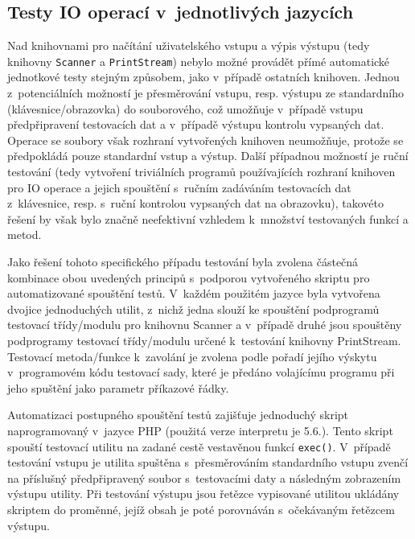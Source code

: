 \documentclass[czech,BP]{thesiskiv}
\begin{document}
\subsection{Testy IO operací v~jednotlivých jazycích}
Nad knihovnami pro načítání uživatelského vstupu a výpis výstupu (tedy knihovny \texttt{Scanner} a \texttt{PrintStream}) nebylo možné provádět přímé automatické jednotkové testy stejným způsobem, jako v~případě ostatních knihoven. Jednou z~potenciálních možností je přesměrování vstupu, resp. výstupu ze standardního (klávesnice/obrazovka) do souborového, což umožňuje v~případě vstupu předpřipravení testovacích dat a v~případě výstupu kontrolu vypsaných dat. Operace se soubory však rozhraní vytvořených knihoven neumožňuje, protože se předpokládá pouze standardní vstup a výstup. Další případnou možností je ruční testování (tedy vytvoření triviálních programů používajících rozhraní knihoven pro IO operace a jejich spouštění s~ručním zadáváním testovacích dat z~klávesnice, resp. s~ruční kontrolou vypsaných dat na obrazovku), takovéto řešení by však bylo značně neefektivní vzhledem k~množství testovaných funkcí a metod.\par
Jako řešení tohoto specifického případu testování byla zvolena částečná kombinace obou uvedených principů s~podporou vytvořeného skriptu pro automatizované spouštění testů. V~každém použitém jazyce byla vytvořena dvojice jednoduchých utilit, z~nichž jedna slouží ke spouštění podprogramů testovací třídy/modulu pro knihovnu Scanner a v~případě druhé jsou spouštěny podprogramy testovací třídy/modulu určené k~testování knihovny PrintStream. Testovací metoda/funkce k~zavolání je zvolena podle pořadí jejího výskytu v~programovém kódu testovací sady, které je předáno volajícímu programu při jeho spuštění jako parametr příkazové řádky.\par
Automatizaci postupného spouštění testů zajišťuje jednoduchý skript naprogramovaný v~jazyce PHP (použitá verze interpretu je 5.6.). Tento skript spouští testovací utilitu na zadané cestě vestavěnou funkcí \texttt{exec()}. V~případě testování vstupu je utilita spuštěna s~přesměrováním standardního vstupu zvenčí na příslušný předpřipravený soubor s~testovacími daty a následným zobrazením výstupu utility. Při testování výstupu jsou řetězce vypisované utilitou ukládány skriptem do proměnné, jejíž obsah je poté porovnáván s~očekávaným řetězcem výstupu.
\end{document}
